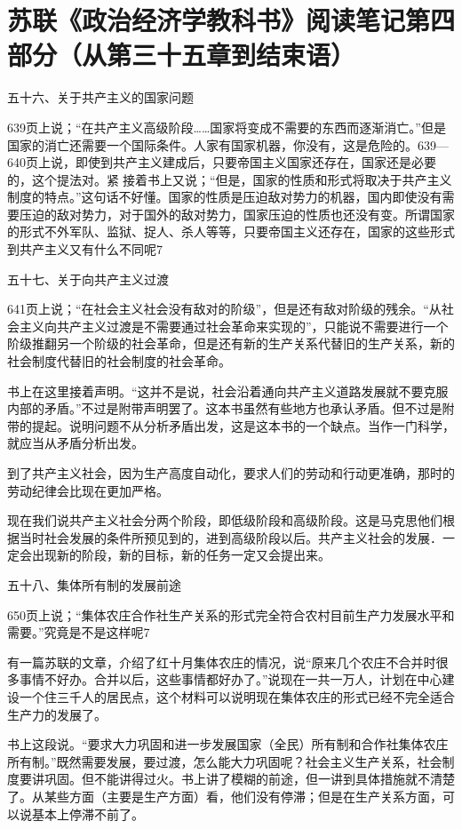 \section[苏联《政治经济学教科书》阅读笔记第四部分（从第三十五章到结束语）]{苏联《政治经济学教科书》阅读笔记第四部分（从第三十五章到结束语）}


五十六、关于共产主义的国家问题

639页上说；“在共产主义高级阶段……国家将变成不需要的东西而逐渐消亡。”但是国家的消亡还需要一个国际条件。人家有国家机器，你没有，这是危险的。639—640页上说，即使到共产主义建成后，只要帝国主义国家还存在，国家还是必要的，这个提法对。紧接着书上又说；“但是，国家的性质和形式将取决于共产主义制度的特点。”这句话不好懂。国家的性质是压迫敌对势力的机器，国内即使没有需要压迫的敌对势力，对于国外的敌对势力，国家压迫的性质也还没有变。所谓国家的形式不外军队、监狱、捉人、杀人等等，只要帝国主义还存在，国家的这些形式到共产主义又有什么不同呢7

五十七、关于向共产主义过渡

641页上说；“在社会主义社会没有敌对的阶级”，但是还有敌对阶级的残余。“从社会主义向共产主义过渡是不需要通过社会革命来实现的”，只能说不需要进行一个阶级推翻另一个阶级的社会革命，但是还有新的生产关系代替旧的生产关系，新的社会制度代替旧的社会制度的社会革命。

书上在这里接着声明。“这并不是说，社会沿着通向共产主义道路发展就不要克服内部的矛盾。”不过是附带声明罢了。这本书虽然有些地方也承认矛盾。但不过是附带的提起。说明问题不从分析矛盾出发，这是这本书的一个缺点。当作一门科学，就应当从矛盾分析出发。

到了共产主义社会，因为生产高度自动化，要求人们的劳动和行动更准确，那时的劳动纪律会比现在更加严格。

现在我们说共产主义社会分两个阶段，即低级阶段和高级阶段。这是马克思他们根据当时社会发展的条件所预见到的，进到高级阶段以后。共产主义社会的发展．一定会出现新的阶段，新的目标，新的任务一定又会提出来。

五十八、集体所有制的发展前途

650页上说；“集体农庄合作社生产关系的形式完全符合农村目前生产力发展水平和需要。”究竟是不是这样呢7

有一篇苏联的文章，介绍了红十月集体农庄的情况，说“原来几个农庄不合并时很多事情不好办。合并以后，这些事情都好办了。”说现在一共一万人，计划在中心建设一个住三千人的居民点，这个材料可以说明现在集体农庄的形式已经不完全适合生产力的发展了。

书上这段说。“要求大力巩固和进一步发展国家（全民）所有制和合作社集体农庄所有制。”既然需要发展，要过渡，怎么能大力巩固呢？社会主义生产关系，社会制度要讲巩固。但不能讲得过火。书上讲了模糊的前途，但一讲到具体措施就不清楚了。从某些方面（主要是生产方面）看，他们没有停滞；但是在生产关系方面，可以说基本上停滞不前了。

